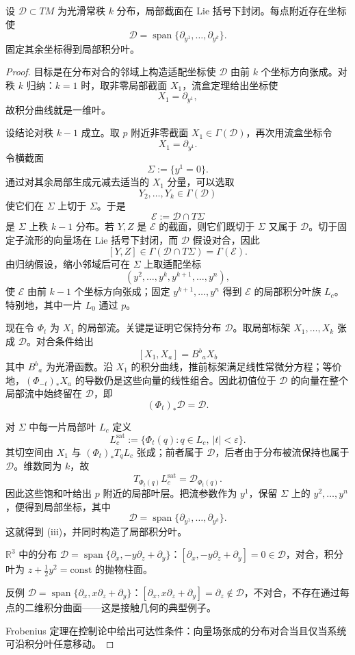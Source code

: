 \begin{theorem}
设 $\mathcal D\subset TM$ 为光滑常秩 $k$ 分布，局部截面在 Lie 括号下封闭。每点附近存在坐标使\[\mathcal D=\operatorname{span}\{\partial_{y^1},\ldots,\partial_{y^k}\}.\]固定其余坐标得到局部积分叶。
\end{theorem}

\begin{proof}
目标是在分布对合的邻域上构造适配坐标使 $\mathcal D$ 由前 $k$ 个坐标方向张成。对秩 $k$ 归纳：$k=1$ 时，取非零局部截面 $X_1$，流盒定理给出坐标使
\[
X_1=\partial_{y^1},
\]
故积分曲线就是一维叶。

设结论对秩 $k-1$ 成立。取 $p$ 附近非零截面 $X_1\in\Gamma(\mathcal D)$，再次用流盒坐标令
\[
X_1=\partial_{y^1}.
\]
令横截面
\[
\Sigma:=\{y^1=0\}.
\]
通过对其余局部生成元减去适当的 $X_1$ 分量，可以选取
\[
Y_2,\ldots,Y_k\in\Gamma(\mathcal D)
\]
使它们在 $\Sigma$ 上切于 $\Sigma$。于是
\[
\mathcal E:=\mathcal D\cap T\Sigma
\]
是 $\Sigma$ 上秩 $k-1$ 分布。若 $Y,Z$ 是 $\mathcal E$ 的截面，则它们既切于 $\Sigma$ 又属于 $\mathcal D$。切于固定子流形的向量场在 Lie 括号下封闭，而 $\mathcal D$ 假设对合，因此
\[
[Y,Z]\in\Gamma(\mathcal D\cap T\Sigma)=\Gamma(\mathcal E).
\]
由归纳假设，缩小邻域后可在 $\Sigma$ 上取适配坐标
\[
(y^2,\ldots,y^k,y^{k+1},\ldots,y^n),
\]
使 $\mathcal E$ 由前 $k-1$ 个坐标方向张成；固定
$y^{k+1},\ldots,y^n$ 得到 $\mathcal E$ 的局部积分叶族 $L_c$。特别地，其中一片 $L_0$ 通过 $p$。

现在令 $\Phi_t$ 为 $X_1$ 的局部流。关键是证明它保持分布 $\mathcal D$。取局部标架 $X_1,\ldots,X_k$ 张成 $\mathcal D$。对合条件给出
\[
[X_1,X_a]=B^b{}_aX_b
\]
其中 $B^b{}_a$ 为光滑函数。沿 $X_1$ 的积分曲线，推前标架满足线性常微分方程；等价地，$(\Phi_{-t})_*X_a$ 的导数仍是这些向量的线性组合。因此初值位于 $\mathcal D$ 的向量在整个局部流中始终留在 $\mathcal D$，即
\[
(\Phi_t)_*\mathcal D=\mathcal D.
\]

对 $\Sigma$ 中每一片局部叶 $L_c$ 定义
\[
L_c^{\mathrm{sat}}
:=\{\Phi_t(q):q\in L_c,\ |t|<\varepsilon\}.
\]
其切空间由 $X_1$ 与 $(\Phi_t)_*T_qL_c$ 张成；前者属于 $\mathcal D$，后者由于分布被流保持也属于 $\mathcal D$。维数同为 $k$，故
\[
T_{\Phi_t(q)}L_c^{\mathrm{sat}}
=\mathcal D_{\Phi_t(q)}.
\]
因此这些饱和叶给出 $p$ 附近的局部叶层。把流参数作为 $y^1$，保留 $\Sigma$ 上的
$y^2,\ldots,y^n$，便得到局部坐标，其中
\[
\mathcal D
=\operatorname{span}\{\partial_{y^1},\ldots,\partial_{y^k}\}.
\]
这就得到 (iii)，并同时构造了局部积分叶。

$\mathbb R^3$ 中的分布 $\mathcal D=\operatorname{span}\{\partial_x,-y\partial_z+\partial_y\}$：$[\partial_x,-y\partial_z+\partial_y]=0\in\mathcal D$，对合，积分叶为 $z+\tfrac12y^2=\text{const}$ 的抛物柱面。

反例 $\mathcal D=\operatorname{span}\{\partial_x,x\partial_z+\partial_y\}$：$[\partial_x,x\partial_z+\partial_y]=\partial_z\notin\mathcal D$，不对合，不存在通过每点的二维积分曲面——这是接触几何的典型例子。

Frobenius 定理在控制论中给出可达性条件：向量场张成的分布对合当且仅当系统可沿积分叶任意移动。
\end{proof}


